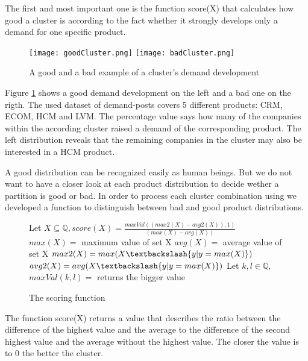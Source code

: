 The first and most important one is the function score(X) that calculates how good a cluster is according to the fact whether
it strongly develops only a demand for one specific product.

\begin{figure}[ht]
\texttt{[image: goodCluster.png]}
\texttt{[image: badCluster.png]}
\centering
\caption{A good and a bad example of a cluster's demand development}
\label{fig:clusterDemandDevelopment}
\end{figure}

Figure \ref{fig:clusterDemandDevelopment} shows a good demand development on the left and a bad one on the rigth. The used dataset
of demand-posts covers 5 different products: CRM, ECOM, HCM and LVM. The percentage value says how many of the companies within
the according cluster raised a demand of the corresponding product.
The left distribution reveals that the remaining companies in the cluster may also be interested in a HCM product.

A good distribution can be recognized easily as human beings. But we do not want to have a closer look  at each
product distribution to decide wether a partition is good or bad.
In order to process each cluster combination using we developed a function to
distinguish between bad and good product distributions.

\begin{figure}[ht]
  {
    \Large Let $ X \subseteq \mathbb{Q},
    score(X) = \frac{ maxVal( ( max2(X) - avg2(X) ), 1 ) }{ ( max(X) - avg(X) ) }$ \newline \newline
    $max(X) =  $ \large maximum value of set X \newline
    $avg(X) =  $ \large average value of set X \newline
    $max2(X) =  max( X \textbackslash \{ y | y = max(X)\} )$ \newline
    $avg2(X) =  avg( X \textbackslash \{ y | y = max(X)\} ) $ \newline
    \large Let $k,l \in \mathbb{Q},$ $maxVal(k,l) =$  \large returns the bigger value \newline
  }
  \centering
  \caption{The scoring function}
  \label{fig:scoringFunction}
\end{figure}

The function score(X) returns a value that describes the ratio between the difference of the highest value and the
average to the difference of the second highest value and the average without the highest value. The closer the value
is to 0 the better the cluster.

